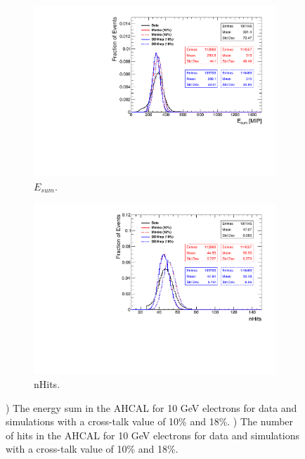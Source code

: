 \begin{figure}[htbp!]
  \centering
  \begin{subfigure}[t]{0.49\textwidth}
    \includegraphics[width=1.\linewidth]{chap5/fig_AHCAL_Timing/Electrons/Comparison_EnergySum_Xtalk_electrons10GeV.pdf}
    \caption{$E_{sum}$.} \label{fig:e10Evis}
  \end{subfigure}
  \hfill
  \begin{subfigure}[t]{0.49\textwidth}
    \includegraphics[width=1.\linewidth]{chap5/fig_AHCAL_Timing/Electrons/Comparison_nHits_Xtalk_electrons10GeV.pdf}
    \caption{nHits.} \label{fig:e10nHits}
  \end{subfigure}
  \caption{) The energy sum in the AHCAL for 10 GeV electrons for data and simulations with a cross-talk value of 10\% and 18\%. ) The number of hits in the AHCAL for 10 GeV electrons for data and simulations with a cross-talk value of 10\% and 18\%.}
  \label{fig:e10Val}
\end{figure}

